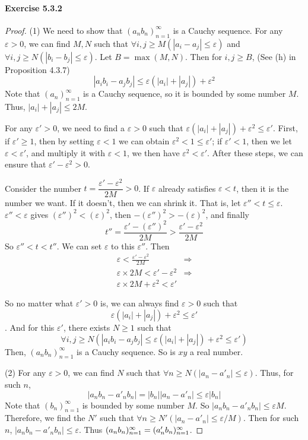 \paragraph{Exercise 5.3.2} \label{exercise5.3.2}
\begin{proof}
(1)
We need to show that $(a_nb_n)^\infty_{n=1}$ is a Cauchy sequence. For any $\varepsilon>0$, we can find $M,N$ such that
$\forall i,j\geq M(|a_i-a_j| \leq \varepsilon)$ and $\forall i,j\geq N(|b_i-b_j| \leq \varepsilon)$. Let $B = \max{(M,N)}$. Then for
$i,j \geq B$, (See (h) in Proposition 4.3.7)
\[
|a_ib_i - a_jb_j| \leq \varepsilon(|a_i| + |a_j|) + \varepsilon^2
\]
Note that $(a_n)^\infty_{n=1}$ is a Cauchy sequence, so it is bounded by some number $M$. Thus,
$|a_i| + |a_j| \leq 2M$.

For any $\varepsilon' >0$, we need to find a $\varepsilon >0$ such that
$\varepsilon(|a_i| + |a_j|) + \varepsilon^2 \leq \varepsilon'$. First, if $\varepsilon' \geq 1$, then by
setting $\varepsilon < 1$ we can obtain $\varepsilon^2 < 1 \leq \varepsilon'$; if $\varepsilon' < 1$, then we let $\varepsilon < \varepsilon'$, and multiply it with $\varepsilon < 1$, we then have
$\varepsilon^2 < \varepsilon'$. After these steps, we can ensure that $\varepsilon' - \varepsilon^2>0$.

Consider the number $t = \dfrac{\varepsilon' - \varepsilon^2}{2M}>0$. If $\varepsilon$ already satisfies
$\varepsilon <t$, then it is the number we want. If it doesn't, then we can shrink it. That is, let
$\varepsilon'' < t \leq \varepsilon$. $\varepsilon'' < \varepsilon$ gives
$(\varepsilon'')^2 < (\varepsilon)^2$, then $-(\varepsilon'')^2 > -(\varepsilon)^2$, and finally
\[
t'' = \frac{\varepsilon' - (\varepsilon'')^2}{2M}>\frac{\varepsilon' - \varepsilon^2}{2M}
\]
So $\varepsilon'' < t < t''$. We can set $\varepsilon$ to this $\varepsilon''$. Then
\begin{align*}
\varepsilon < \frac{\varepsilon' - \varepsilon^2}{2M} &\Longrightarrow \\
\varepsilon \times 2M < \varepsilon' - \varepsilon^2 &\Longrightarrow \\
\varepsilon \times 2M + \varepsilon^2 < \varepsilon'
\end{align*}

So no matter what $\varepsilon'>0$ is, we can always find $\varepsilon >0$ such that
\[
\varepsilon(|a_i| + |a_j|) + \varepsilon^2 \leq \varepsilon'
\].
And for this $\varepsilon'$, there exists $N\geq 1$ such that
\[
\forall i,j\geq N(|a_ib_i - a_jb_j| \leq \varepsilon(|a_i| + |a_j|) + \varepsilon^2 \leq \varepsilon')
\]
Then, $(a_nb_n)^\infty_{n=1}$ is a Cauchy sequence. So is $xy$ a real number.

(2)
For any $\varepsilon >0$, we can find $N$ such that $\forall n\geq N(|a_n-a'_n|\leq \varepsilon)$. Thus, for
such $n$,
\[
|a_nb_n - a'_nb_n| = |b_n||a_n - a'_n| \leq \varepsilon|b_n|
\]
Note that $(b_n)^\infty_{n=1}$ is bounded by some number $M$. So $|a_nb_n - a'_nb_n| \leq \varepsilon M$.
Therefore, we find the $N'$ such that $\forall n\geq N'(|a_n-a'_n|\leq \varepsilon/M)$. Then for such $n$,
$|a_nb_n - a'_nb_n| \leq \varepsilon$. Thus $(a_nb_n)^\infty_{n=1} = (a'_nb_n)^\infty_{n=1}$.
\end{proof}

